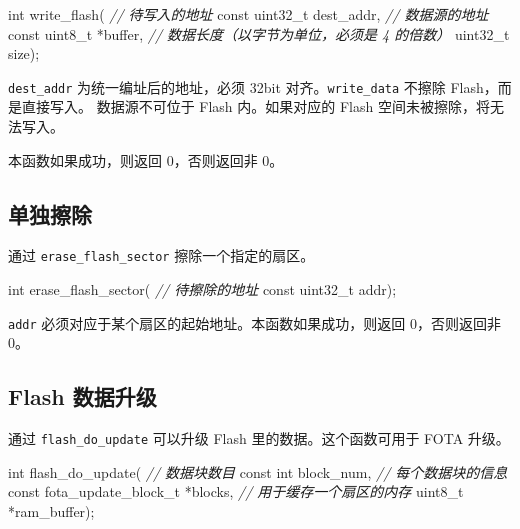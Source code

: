 \documentclass[
  12pt,
]{book}
\newenvironment{Shaded}{\begin{snugshade}}{\end{snugshade}}
\newcommand{\CommentTok}[1]{\textcolor[rgb]{0.56,0.35,0.01}{\textit{#1}}}
\newcommand{\DataTypeTok}[1]{\textcolor[rgb]{0.13,0.29,0.53}{#1}}
\newcommand{\NormalTok}[1]{#1}
\begin{document}
\begin{Shaded}
\begin{Highlighting}[]
\DataTypeTok{int}\NormalTok{ write_flash(}
    \CommentTok{// 待写入的地址}
    \DataTypeTok{const} \DataTypeTok{uint32_t}\NormalTok{ dest_addr,}
    \CommentTok{// 数据源的地址}
    \DataTypeTok{const} \DataTypeTok{uint8_t}\NormalTok{ *buffer,}
    \CommentTok{// 数据长度（以字节为单位，必须是 4 的倍数）}
    \DataTypeTok{uint32_t}\NormalTok{ size);}
\end{Highlighting}
\end{Shaded}

\texttt{dest\_addr} 为统一编址后的地址，必须 32bit 对齐。\texttt{write\_data} 不擦除 Flash，而是直接写入。
数据源不可位于 Flash 内。如果对应的 Flash 空间未被擦除，将无法写入。

本函数如果成功，则返回 0，否则返回非 0。

\hypertarget{ux5355ux72ecux64e6ux9664}{%
\subsection{单独擦除}\label{ux5355ux72ecux64e6ux9664}}

通过 \texttt{erase\_flash\_sector} 擦除一个指定的扇区。

\begin{Shaded}
\begin{Highlighting}[]
\DataTypeTok{int}\NormalTok{ erase_flash_sector(}
    \CommentTok{// 待擦除的地址}
    \DataTypeTok{const} \DataTypeTok{uint32_t}\NormalTok{ addr);}
\end{Highlighting}
\end{Shaded}

\texttt{addr} 必须对应于某个扇区的起始地址。本函数如果成功，则返回 0，否则返回非 0。

\hypertarget{flash-ux6570ux636eux5347ux7ea7}{%
\subsection{Flash 数据升级}\label{flash-ux6570ux636eux5347ux7ea7}}

通过 \texttt{flash\_do\_update} 可以升级 Flash 里的数据。这个函数可用于 FOTA 升级。

\begin{Shaded}
\begin{Highlighting}[]
\DataTypeTok{int}\NormalTok{ flash_do_update(}
    \CommentTok{// 数据块数目}
    \DataTypeTok{const} \DataTypeTok{int}\NormalTok{ block_num,}
    \CommentTok{// 每个数据块的信息}
    \DataTypeTok{const}\NormalTok{ fota_update_block_t *blocks,}
    \CommentTok{// 用于缓存一个扇区的内存}
    \DataTypeTok{uint8_t}\NormalTok{ *ram_buffer);}
\end{Highlighting}
\end{Shaded}
\end{document}
